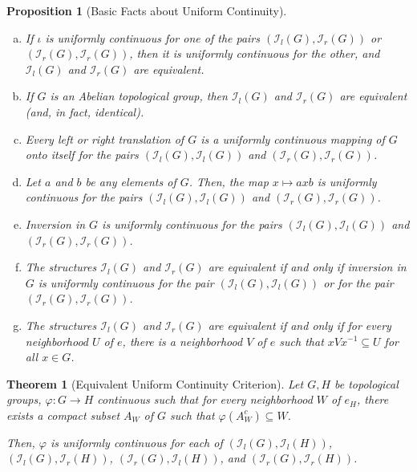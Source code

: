 \documentclass[10pt]{extarticle}
\theoremstyle{plain}
\newtheorem*{theorem}{Theorem}
\newtheorem*{proposition}{Proposition}
\theoremstyle{definition}
\theoremstyle{note}
\renewcommand{\newline}{\hfill\break}
\begin{document}
\begin{proposition}[Basic Facts about Uniform Continuity]
  \begin{enumerate}[(a)]
    \item If $\iota$ is uniformly continuous for one of the pairs $\left(\mathcal{I}_l(G),\mathcal{I}_r(G)\right)$ or $\left(\mathcal{I}_r(G),\mathcal{I}_r(G)\right)$, then it is uniformly continuous for the other, and $\mathcal{I}_l(G)$ and $\mathcal{I}_r(G)$ are equivalent.
    \item If $G$ is an Abelian topological group, then $\mathcal{I}_l(G)$ and $\mathcal{I}_r(G)$ are equivalent (and, in fact, identical).
    \item Every left or right translation of $G$ is a uniformly continuous mapping of $G$ onto itself for the pairs $\left(\mathcal{I}_l(G),\mathcal{I}_l(G)\right)$ and $\left(\mathcal{I}_r(G),\mathcal{I}_r(G)\right)$.
    \item Let $a$ and $b$ be any elements of $G$. Then, the map $x\mapsto axb$ is uniformly continuous for the pairs $\left(\mathcal{I}_l(G),\mathcal{I}_l(G)\right)$ and $\left(\mathcal{I}_r(G),\mathcal{I}_r(G)\right)$.
    \item Inversion in $G$ is uniformly continuous for the pairs $\left(\mathcal{I}_l(G),\mathcal{I}_l(G)\right)$ and $\left(\mathcal{I}_r(G),\mathcal{I}_r(G)\right)$.
    \item The structures $\mathcal{I}_l(G)$ and $\mathcal{I}_r(G)$ are equivalent if and only if inversion in $G$ is uniformly continuous for the pair $\left(\mathcal{I}_l(G),\mathcal{I}_l(G)\right)$ or for the pair $\left(\mathcal{I}_r(G),\mathcal{I}_r(G)\right)$.
    \item The structures $\mathcal{I}_l(G)$ and $\mathcal{I}_r(G)$ are equivalent if and only if for every neighborhood $U$ of $e$, there is a neighborhood $V$ of $e$ such that $xVx^{-1}\subseteq U$ for all $x\in G$.
  \end{enumerate}
\end{proposition}
\begin{theorem}[Equivalent Uniform Continuity Criterion]
  Let $G,H$ be topological groups, $\varphi: G\rightarrow H$ continuous such that for every neighborhood $W$ of $e_H$, there exists a compact subset $A_W$ of $G$ such that $\varphi\left(A_W^{c}\right)\subseteq W$.\newline

  Then, $\varphi$ is uniformly continuous for each of $\left(\mathcal{I}_l(G),\mathcal{I}_l(H)\right)$, $\left(\mathcal{I}_l(G),\mathcal{I}_r(H)\right)$, $\left(\mathcal{I}_r(G),\mathcal{I}_l(H)\right)$, and $\left(\mathcal{I}_r(G),\mathcal{I}_r(H)\right)$.
\end{theorem}
\end{document}
